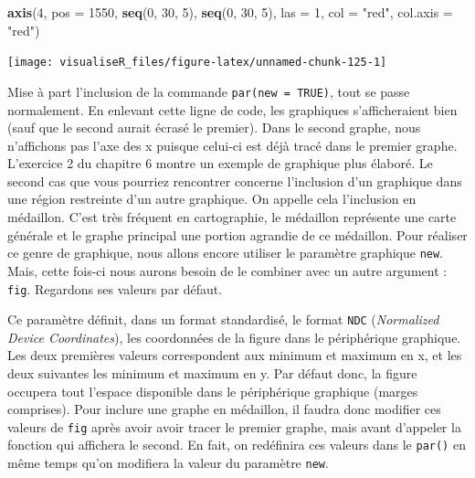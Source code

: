 \documentclass[]{article}
\newenvironment{Shaded}{\begin{snugshade}}{\end{snugshade}}
\newcommand{\CommentTok}[1]{\textcolor[rgb]{0.56,0.35,0.01}{\textit{#1}}}
\newcommand{\DataTypeTok}[1]{\textcolor[rgb]{0.13,0.29,0.53}{#1}}
\newcommand{\DecValTok}[1]{\textcolor[rgb]{0.00,0.00,0.81}{#1}}
\newcommand{\KeywordTok}[1]{\textcolor[rgb]{0.13,0.29,0.53}{\textbf{#1}}}
\newcommand{\NormalTok}[1]{#1}
\newcommand{\OperatorTok}[1]{\textcolor[rgb]{0.81,0.36,0.00}{\textbf{#1}}}
\newcommand{\StringTok}[1]{\textcolor[rgb]{0.31,0.60,0.02}{#1}}
\begin{document}
\begin{Shaded}
\begin{Highlighting}[]
\KeywordTok{axis}\NormalTok{(}\DecValTok{4}\NormalTok{, }\DataTypeTok{pos =} \DecValTok{1550}\NormalTok{, }\KeywordTok{seq}\NormalTok{(}\DecValTok{0}\NormalTok{, }\DecValTok{30}\NormalTok{, }\DecValTok{5}\NormalTok{), }\KeywordTok{seq}\NormalTok{(}\DecValTok{0}\NormalTok{, }\DecValTok{30}\NormalTok{, }\DecValTok{5}\NormalTok{), }\DataTypeTok{las =} \DecValTok{1}\NormalTok{, }\DataTypeTok{col =} \StringTok{"red"}\NormalTok{, }\DataTypeTok{col.axis =} \StringTok{"red"}\NormalTok{)}
\end{Highlighting}
\end{Shaded}

\begin{center}\texttt{[image: visualiseR\_files/figure-latex/unnamed-chunk-125-1]} \end{center}

Mise à part l'inclusion de la commande \texttt{par(new\ =\ TRUE)}, tout se passe
normalement. En enlevant cette ligne de code, les graphiques s'afficheraient
bien (sauf que le second aurait écrasé le premier). Dans le second graphe, nous
n'affichons pas l'axe des x puisque celui-ci est déjà tracé dans le premier
graphe. L'exercice 2 du chapitre 6 montre un exemple de graphique plus élaboré.
Le second cas que vous pourriez rencontrer concerne l'inclusion d'un graphique
dans une région restreinte d'un autre graphique. On appelle cela l'inclusion en
médaillon. C'est très fréquent en cartographie, le médaillon représente une
carte générale et le graphe principal une portion agrandie de ce médaillon. Pour
réaliser ce genre de graphique, nous allons encore utiliser le paramètre
graphique \texttt{new}. Mais, cette fois-ci nous aurons besoin de le combiner avec un
autre argument : \texttt{fig}. Regardons ses valeurs par défaut.

\begin{Shaded}
\end{Shaded}

Ce paramètre définit, dans un format standardisé, le format \texttt{NDC} (\emph{Normalized
Device Coordinates}), les coordonnées de la figure dans le périphérique
graphique. Les deux premières valeurs correspondent aux minimum et maximum en x,
et les deux suivantes les minimum et maximum en y. Par défaut donc, la figure
occupera tout l'espace disponible dans le périphérique graphique (marges
comprises). Pour inclure une graphe en médaillon, il faudra donc modifier ces
valeurs de \texttt{fig} après avoir avoir tracer le premier graphe, mais avant
d'appeler la fonction qui affichera le second. En fait, on redéfinira ces
valeurs dans le \texttt{par()} en même temps qu'on modifiera la valeur du paramètre
\texttt{new}.
\end{document}
